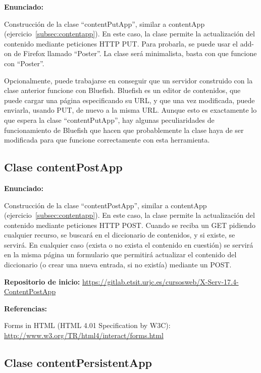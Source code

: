 \textbf{Enunciado:}

Construcción de la clase ``contentPutApp'', similar a contentApp (ejercicio~\ref{subsec:contentapp}). En este caso, la clase permite la actualización del contenido mediante peticiones HTTP PUT. Para probarla, se puede usar el add-on de Firefox llamado ``Poster''. La clase será minimalista, basta con que funcione con ``Poster''.

Opcionalmente, puede trabajarse en conseguir que un servidor construido con la clase anterior funcione con Bluefish. Bluefish es un editor de contenidos, que puede cargar una página especificando su URL, y que una vez modificada, puede enviarla, usando PUT, de nuevo a la misma URL. Aunque esto es exactamente lo que espera la clase ``contentPutApp'', hay algunas peculiaridades de funcionamiento de Bluefish que hacen que probablemente la clase haya de ser modificada para que funcione correctamente con esta herramienta.

\subsection{Clase contentPostApp}
\label{subsec:contentpostapp}

\textbf{Enunciado:}

Construcción de la clase ``contentPostApp'', similar a contentApp (ejercicio~\ref{subsec:contentapp}). En este caso, la clase permite la actualización del contenido mediante peticiones HTTP POST. Cuando se reciba un GET pidiendo cualquier recurso, se buscará en el diccionario de contenidos, y si existe, se servirá. En cualquier caso (exista o no exista el contenido en cuestión) se servirá en la misma página un formulario que permitirá actualizar el contenido del diccionario (o crear una nueva entrada, si no existía) mediante un POST.

\textbf{Repositorio de inicio:} \url{https://gitlab.etsit.urjc.es/cursosweb/X-Serv-17.4-ContentPostApp}

\textbf{Referencias:}

Forms in HTML (HTML 4.01 Specification by W3C): \\
\url{http://www.w3.org/TR/html4/interact/forms.html}

\subsection{Clase contentPersistentApp}
\label{subsec:contentpersistentapp}

